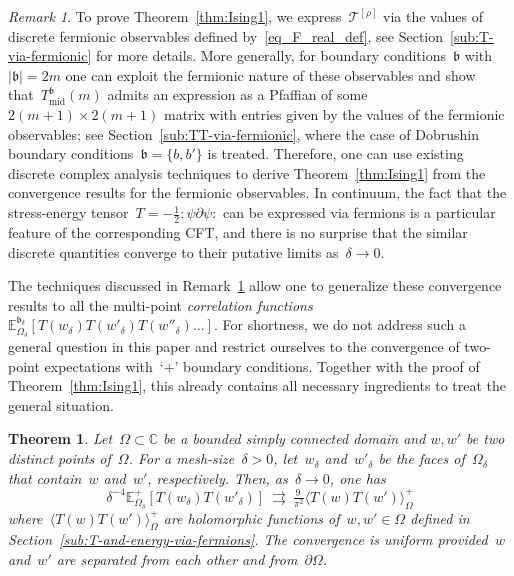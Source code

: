\documentclass[reqno,11pt,a4paper]{amsart}
\newtheorem{theorem}{Theorem}
\theoremstyle{remark}
\newtheorem{remark}[proposition]{Remark}
\newcommand{\C}{\mathbb{C}}
\newcommand{\Tm}{T_{\mathrm{mid}}}        \newcommand{\Cm}{c_{\mathrm{mid}}}
\renewcommand{\b}{\mathfrak{b}}
\newcommand{\Edelta}{\mathbb{E}_{\Omega_\delta}}
\newcommand\Corr[1]{\langle #1 \rangle}
\newcommand\CorrO[2][+]{\Corr{#2}_\Omega^{#1}}
\begin{document}
\begin{remark} \label{rem:strategy_thm1}
	To prove Theorem~\ref{thm:Ising1}, we express~$\mathcal{T}^{[\rho]}$ via the values of discrete fermionic observables defined by~\eqref{eq_F_real_def}, see Section~\ref{sub:T-via-fermionic} for more details. 
	More generally, for boundary conditions~$\b$ with~$|\b|=2m$ one can exploit the fermionic nature of these observables and show that~$\Tm^\b(m)$ admits an expression as a Pfaffian of some~$2(m\!+\!1)\times 2(m\!+\!1)$ matrix with entries given by the values of the fermionic observables; see Section~\ref{sub:TT-via-fermionic}, where the case of Dobrushin boundary conditions~$\b=\{b,b'\}$ is treated. 
	Therefore, one can use existing discrete complex analysis techniques to derive Theorem~\ref{thm:Ising1} from the convergence results for the fermionic observables. 
	In continuum, the fact that the stress-energy tensor~$T=-\frac{1}{2}:\!\psi\partial\psi\!:$ can be expressed via fermions is a particular feature of the corresponding CFT, and there is no surprise that the similar discrete quantities converge to their putative limits as~$\delta\to 0$. 
\end{remark}

The techniques discussed in Remark~\ref{rem:strategy_thm1} allow one to generalize these convergence results to all the multi-point \emph{correlation functions}~$\Edelta^{\b_\delta}[T(w_\delta)T(w'_\delta)T(w''_\delta)\dots]$. 
For shortness, we do not address such a general question in this paper and restrict ourselves to the convergence of two-point expectations with~`$+$' boundary conditions. 
Together with the proof of Theorem~\ref{thm:Ising1}, this already contains all necessary ingredients to treat the general situation.

\begin{theorem} \label{thm:Ising2}
	Let~$\Omega\subset\C$ be a bounded simply connected domain and $w,w'$ be two distinct points of~$\Omega$. 
	For a mesh-size~$\delta>0$, let~$w_\delta$ and~$w'_\delta$ be the faces of~$\Omega_\delta$ that contain~$w$ and~$w'$, respectively.
	Then, as~$\delta \to 0$, one has
	\[
		\delta^{-4}\Edelta^+[T(w_\delta)T(w'_\delta)]~\rightrightarrows~\tfrac{9\,}{\pi^2}\CorrO{T(w)T(w')}
	\]
	where~$\CorrO{T(w)T(w')}$ are holomorphic functions of~$w,w'\in\Omega$ defined in Section~\ref{sub:T-and-energy-via-fermions}.
	The convergence is uniform provided~$w$ and~$w'$ are separated from each other and from~$\partial\Omega$.
\end{theorem}
\end{document}
